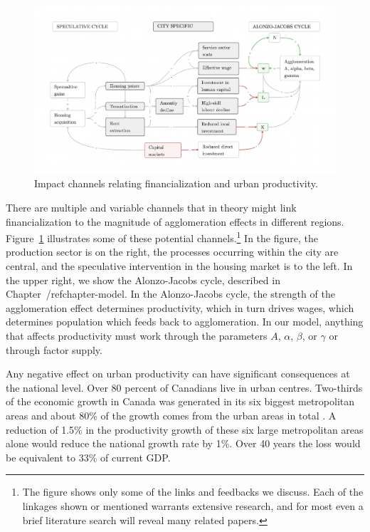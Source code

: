 \begin{figure}[h!tb]
\begin{adjustwidth}{-0.24\textwidth}{-0.24\textwidth}
\centering
\includegraphics[scale=.15 ]{fig/impact-channels.png}%
\end{adjustwidth}
\caption{Impact channels relating financialization and urban productivity.} \label{fig-impact-channels}
\end{figure}

There are multiple and variable channels that in theory might link financialization to the magnitude of agglomeration effects in different regions. Figure~\ref{fig-impact-channels} illustrates some of these potential channels.\footnote{The figure shows only some of the links and feedbacks we discuss. Each of the linkages shown or mentioned warrants extensive research, and for most even a brief literature search will reveal many related papers.} 
In the figure, the production sector is on the right, the processes occurring within the city are central, and the speculative intervention in the housing market is to the left. In the upper right, we show the \gls{Alonzo-Jacobs cycle}, described in Chapter~/ref{chapter-model}. In the Alonzo-Jacobs cycle, the strength of the agglomeration effect determines productivity, which in turn drives wages, which determines population which feeds back to agglomeration. In our model, anything that affects productivity must work through the parameters $A$, $\alpha$, $\beta$, or $\gamma$ or through factor supply. 

Any negative effect on urban productivity can have significant consequences at the national level. Over 80 percent of Canadians live in urban centres. Two-thirds of the economic growth in Canada was generated in its six biggest metropolitan areas and about 80\% of the growth comes from the urban areas in total \cite{w.fanImportanceCitiesEmphasis2010}. A reduction of 1.5\% in the productivity growth of these six large metropolitan areas alone would reduce the national growth rate by 1\%. Over 40 years the loss would be equivalent to 33\% of current GDP.

